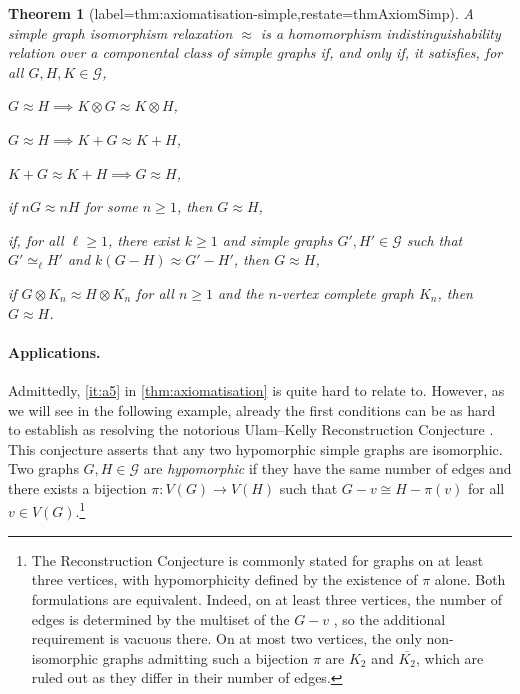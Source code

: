 \documentclass[11pt]{scrartcl}
\theoremstyle{definition}
\theoremstyle{plain}
\newtheorem{theorem}[definition]{Theorem}
\theoremstyle{remark}
\newcommand{\G}{\mathcal{G}}
\begin{document}
	\begin{theorem}[label=thm:axiomatisation-simple,restate=thmAxiomSimp]
		A simple graph isomorphism relaxation $\approx$ is a homomorphism indistinguishability relation
		over a componental class of simple graphs if, and only if,
		it satisfies, for all $G, H, K \in \G$,
		\begin{assertions}
			\item\label{it:s1} $G \approx H \implies K \otimes G \approx K \otimes H$,
			\item\label{it:s2} $G \approx H \implies K + G \approx K + H$,
			\item\label{it:s3} $K + G \approx K + H \implies G \approx H$,
			\item\label{it:s4} if $nG \approx nH $ for some $n\geq1$, then $ G \approx H$,
			\item\label{it:s5} if, for all $\ell \geq 1$, there exist $k \geq 1$ and simple graphs $G', H' \in \G$
			such that $G' \simeq_\ell H'$ and $k(G-H) \approx G' - H'$, then $G \approx H$,
			\item\label{it:s6} if $G \otimes K_n \approx H \otimes K_n$ for all $n \geq 1$ and the $n$-vertex complete graph $K_n$, then $G \approx H$.
		\end{assertions}
	\end{theorem}


    \paragraph{Applications.}
	Admittedly, \cref{it:a5} in \cref{thm:axiomatisation} is quite hard to relate to. 
	However, as we will see in the following example, already the first conditions can be as hard to establish as resolving the notorious Ulam--Kelly Reconstruction Conjecture \cite{ulam_collection_1960,kelly_congruence_1957}.
	This conjecture asserts that any two hypomorphic simple graphs are isomorphic.
	Two graphs $G, H \in \G$ are \emph{hypomorphic} if they have the same number of edges and there exists a bijection $\pi \colon V(G) \to V(H)$
	such that $G - v \cong H- \pi(v)$ for all $v \in V(G)$.\footnote{The Reconstruction Conjecture is commonly stated for graphs on at least three vertices,
	with hypomorphicity defined by the existence of $\pi$ alone.
	Both formulations are equivalent.
	Indeed, on at least three vertices, the number of edges is determined by the multiset of the $G - v$ \cite{kelly_congruence_1957},
	so the additional requirement is vacuous there.
	On at most two vertices, the only non-isomorphic graphs admitting such a bijection $\pi$ are $K_2$ and $\overline{K_2}$,
	which are ruled out as they differ in their number of edges.} 
\end{document}

